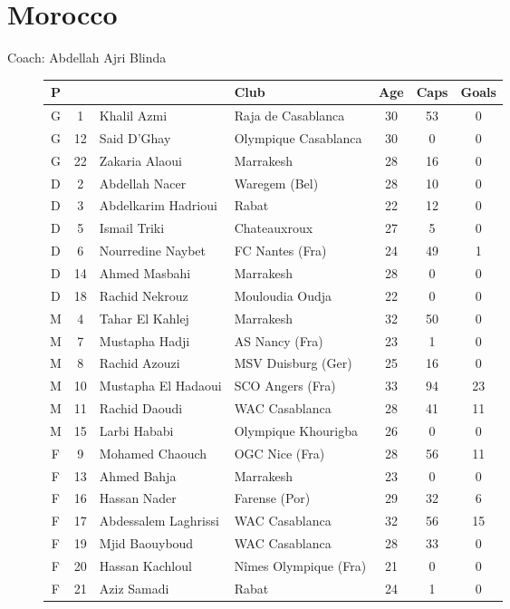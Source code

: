 \chapter{Morocco}
\newline
\newline
Coach: Abdellah Ajri Blinda
\begin{figure}[H]
\begin{tabular}{c c l l c c c}
P & & & Club & Age & Caps & Goals \\ \hline
G & 1 & Khalil Azmi & Raja de Casablanca & 30 & 53 & 0 \\
G & 12 & Said D'Ghay & Olympique Casablanca & 30 & 0 & 0 \\
G & 22 & Zakaria Alaoui & Marrakesh & 28 & 16 & 0 \\ \hline
D & 2 & Abdellah Nacer & Waregem (Bel) & 28 & 10 & 0 \\
D & 3 & Abdelkarim Hadrioui & Rabat & 22 & 12 & 0 \\
D & 5 & Ismail Triki & Chateauxroux & 27 & 5 & 0 \\
D & 6 & Nourredine Naybet & FC Nantes (Fra) & 24 & 49 & 1 \\
D &14 & Ahmed Masbahi & Marrakesh & 28 & 0 & 0 \\
D &18 & Rachid Nekrouz & Mouloudia Oudja & 22 & 0 & 0 \\ \hline
M & 4 & Tahar El Kahlej & Marrakesh & 32 & 50 & 0 \\
M & 7 & Mustapha Hadji & AS Nancy (Fra) & 23 & 1 & 0 \\
M & 8 & Rachid Azouzi & MSV Duisburg (Ger) & 25 & 16 & 0 \\
M & 10 & Mustapha El Hadaoui & SCO Angers (Fra) & 33 & 94 & 23 \\
M & 11 & Rachid Daoudi & WAC Casablanca & 28 & 41 & 11 \\
M & 15 & Larbi Hababi & Olympique Khourigba & 26 & 0 & 0 \\ \hline
F & 9 & Mohamed Chaouch & OGC Nice (Fra) & 28 & 56 & 11 \\
F & 13 & Ahmed Bahja & Marrakesh & 23 & 0 & 0 \\
F & 16 & Hassan Nader & Farense (Por) & 29 & 32 & 6 \\
F & 17 & Abdessalem Laghrissi & WAC Casablanca & 32 & 56 & 15 \\
F & 19 & Mjid Baouyboud & WAC Casablanca & 28 & 33 & 0 \\
F & 20 & Hassan Kachloul & N{\^i}mes Olympique (Fra) & 21 & 0 & 0 \\
F & 21 & Aziz Samadi & Rabat & 24 & 1 & 0 \\ \hline
\end{tabular}
\end{figure}
